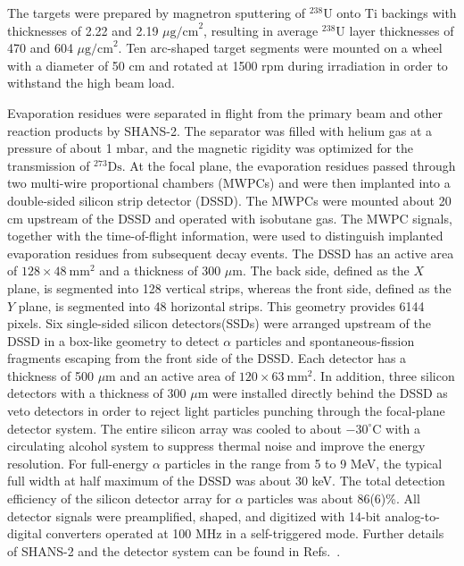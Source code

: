 \documentclass[final,5p,times,twocolumn,number,sort&compress]{elsarticle}
\begin{document}
The targets were prepared by magnetron sputtering of $^{238}\text{U}$ onto Ti backings with thicknesses of 2.22 and 2.19 $\mu\text{g/cm}^{2}$, resulting in average $^{238}\text{U}$ layer thicknesses of 470 and 604 $\mu\text{g/cm}^{2}$. Ten arc-shaped target segments were mounted on a wheel with a diameter of 50 cm and rotated at 1500 rpm during irradiation in order to withstand the high beam load.

Evaporation residues were separated in flight from the primary beam and other reaction products by SHANS-2. The separator was filled with helium gas at a pressure of about 1 mbar, and the magnetic rigidity was optimized for the transmission of $^{273}\text{Ds}$. At the focal plane, the evaporation residues passed through two multi-wire proportional chambers (MWPCs) and were then implanted into a double-sided silicon strip detector (DSSD). The MWPCs were mounted about 20 cm upstream of the DSSD and operated with isobutane gas. The MWPC signals, together with the time-of-flight information, were used to distinguish implanted evaporation residues from subsequent decay events.
The DSSD has an active area of $128 \times 48\ \text{mm}^{2}$ and a thickness of 300 $\mu\text{m}$. The back side, defined as the $X$ plane, is segmented into 128 vertical strips, whereas the front side, defined as the $Y$ plane, is segmented into 48 horizontal strips. This geometry provides 6144 pixels. Six single-sided silicon detectors(SSDs) were arranged upstream of the DSSD in a box-like geometry to detect $\alpha$ particles and spontaneous-fission fragments escaping from the front side of the DSSD. Each detector has a thickness of 500 $\mu\text{m}$ and an active area of $120 \times 63\ \text{mm}^{2}$. In addition, three silicon detectors with a thickness of 300 $\mu\text{m}$ were installed directly behind the DSSD as veto detectors in order to reject light particles punching through the focal-plane detector system. The entire silicon array was cooled to about $-30^{\circ}\text{C}$ with a circulating alcohol system to suppress thermal noise and improve the energy resolution. For full-energy $\alpha$ particles in the range from 5 to 9 MeV, the typical full width at half maximum of the DSSD was about 30 keV. The total detection efficiency of the silicon detector array for $\alpha$ particles was about 86(6)\%. All detector signals were preamplified, shaped, and digitized with 14-bit analog-to-digital converters operated at 100 MHz in a self-triggered mode. Further details of SHANS-2 and the detector system can be found in Refs.~\cite{xu2023GasfilledRecoilSeparator,sheng2021IonopticalDesignMultiparticle}.
\end{document}

